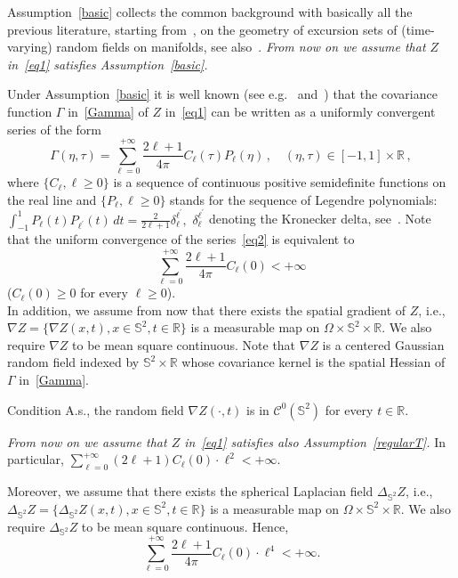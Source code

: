\documentclass[AHL,Unicode,longabstracts,published]{cedram}
\newcommand{\clC}{\mathcal{C}}
\newcommand{\bbS}{\mathbb{S}}
\newcommand{\bbR}{\mathbb{R}}
\begin{document}
Assumption~\ref{basic} collects the common background with basically all the previous literature, starting from~\cite{adlertaylor}, on the geometry of excursion sets of (time-varying) random fields on manifolds, see also~\cite {BP17, LO13, MRV:20}. \emph{From now on we assume that $Z$ in~\eqref{eq1} satisfies Assumption~\ref{basic}.}

Under Assumption~\ref{basic} it is well known (see e.g.~\cite[Theorem~3.3] {BP17} and~\cite[Theorem~3]{MM18}) that the covariance function $\Gamma$ in~\eqref{Gamma} of $Z$ in~\eqref{eq1} can be written as a uniformly convergent series of the form
\begin{equation}\label{eq2}
\Gamma(\eta, \tau) = \sum_{\ell=0}^{+\infty} \frac{2\ell+1}{4\pi} C_\ell(\tau) P_\ell(\eta)\,,\quad (\eta, \tau) \in [-1,1] \times \bbR
\,,
\end{equation}
where $\{ C_\ell, \ell\ge 0\}$ is a sequence of continuous positive semidefinite functions on the real line and $\{ P_\ell,
\ell\ge 0\}$ stands for the sequence of Legendre polynomials: $
\int_{-1}^1 P_{\ell}(t) P_{\ell^{\prime }}(t)\,dt= \frac{2}{2\ell+1}
\delta_{\ell}^{\ell^{\prime }}, $ $\delta_{\ell}^{\ell^{\prime }}$ denoting the Kronecker delta, see~\cite[Section~4.7]{Sze75}. Note that the uniform convergence of the series~\eqref{eq2} is equivalent to
\begin{equation*}
\sum_{\ell = 0}^{+\infty} \frac{2\ell+1}{4\pi} C_\ell(0) < +\infty
\end{equation*}
($C_\ell(0)\ge 0$ for every $\ell\ge 0$). \\
In addition, we assume from now that there exists the spatial gradient of $Z$, i.e., $\nabla Z = \{ \nabla Z(x,t), x\in \bbS^2, t\in \bbR\}$ is a measurable map on $\Omega\times \bbS^2\times \bbR$. We also require $\nabla Z$ to be mean square continuous. Note that $
\nabla Z $ is a centered Gaussian random field indexed by $\bbS^2\times \bbR $ whose covariance kernel is the spatial Hessian of $\Gamma$ in~\eqref{Gamma}.

\begin{enonce}{Condition}\label{regularT}
A.s., the random field $\nabla Z(\cdot,t)$ is in $\clC^0(\bbS^2)$ for every $t\in \bbR$.
\end{enonce}
\emph{From now on we assume that $Z$ in~\eqref{eq1} satisfies also Assumption~\ref{regularT}. } In particular, $\sum_{\ell=0}^{+\infty} (2\ell+1) C_\ell(0) \cdot \ell^2 < +\infty$.

Moreover, we assume that there exists the spherical Laplacian field $\Delta_{\bbS^2} Z$, i.e., $\Delta_{\bbS^2} Z = \{ \Delta_{\bbS^2} Z(x,t), x\in \bbS^2, t\in \bbR\}$ is a measurable map on $\Omega\times \bbS^2\times \bbR$. We also require $\Delta_{\bbS^2} Z$ to be mean square continuous. Hence,
\begin{equation}\label{eqConv}
\sum_{\ell = 0}^{+\infty} \frac{2\ell+1}{4\pi} C_\ell(0) \cdot \ell^4 < +\infty.
\end{equation}
\end{document}
